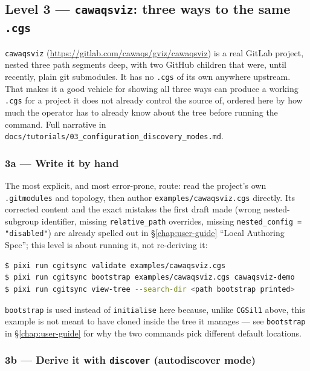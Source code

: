 \subsection{Level 3 --- \texttt{cawaqsviz}: three ways to the same \texttt{.cgs}}

\texttt{cawaqsviz} (\url{https://gitlab.com/cawaqs/gviz/cawaqsviz}) is a
real GitLab project, nested three path segments deep, with two GitHub
children that were, until recently, plain git submodules. It has no
\texttt{.cgs} of its own anywhere upstream. That makes it a good vehicle for
showing all three ways \cgspkg{} can produce a working \texttt{.cgs} for a
project it does not already control the source of, ordered here by how much
the operator has to already know about the tree before running the command.
Full narrative in
\texttt{docs/tutorials/03\_configuration\_discovery\_modes.md}.

\subsubsection{3a --- Write it by hand}

The most explicit, and most error-prone, route: read the project's own
\texttt{.gitmodules} and topology, then author \texttt{examples/cawaqsviz.cgs}
directly. Its corrected content and the exact mistakes the first draft made
(wrong nested-subgroup identifier, missing \texttt{relative\_path}
overrides, missing \texttt{nested\_config = "disabled"}) are already spelled
out in \S\ref{chap:user-guide} ``Local Authoring Spec''; this level is about
running it, not re-deriving it:

\begin{lstlisting}[language=bash]
$ pixi run cgitsync validate examples/cawaqsviz.cgs
$ pixi run cgitsync bootstrap examples/cawaqsviz.cgs cawaqsviz-demo
$ pixi run cgitsync view-tree --search-dir <path bootstrap printed>
\end{lstlisting}

\texttt{bootstrap} is used instead of \texttt{initialise} here because, unlike
\texttt{CGSil1} above, this example is not meant to have \cgspkg{} cloned
inside the tree it manages --- see \texttt{bootstrap} in
\S\ref{chap:user-guide} for why the two commands pick different default
locations.

\subsubsection{3b --- Derive it with \texttt{discover} (autodiscover mode)}


